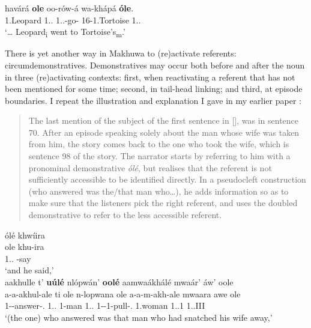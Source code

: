 \documentclass[output=paper]{langscibook}
\begin{document}
\sn
\gll
havárá  \textbf{ole}  oo-rów-á  wa-khápá  \textbf{óle}.{\footnotemark}\\
1.Leopard  1.\DEM{}.\DIST{}  1\SM{}.\PFV{}.\DJ{}-go-\FV{}  16-1.Tortoise  1.\DEM{}.\DIST{}\\
\glt
‘… Leopard\textsubscript{i} went to Tortoise’s\textsubscript{m}.’
\z

There is yet another way in Makhuwa to (re)activate referents: circumdemonstratives. Demonstratives may occur both before and after the noun in three (re)activating contexts: first, when reactivating a referent that has not been mentioned for some time; second, in tail-head linking; and third, at episode boundaries. I repeat the illustration and explanation I gave in my earlier paper \citep[200--201]{vanderWal2010}: 

\begin{quote}
The last mention of the subject of the first sentence in [], was in sentence 70. After an episode speaking solely about the man whose wife was taken from him, the story comes back to the one who took the wife, which is sentence 98 of the story. The narrator starts by referring to him with a pronominal demonstrative \textit{ólé}, but realises that the referent is not sufficiently accessible to be identified directly. In a pseudocleft construction (who answered was the/that man who…), he adds information so as to make sure that the listeners pick the right referent, and uses the doubled demonstrative to refer to the less accessible referent.
\end{quote}


\ea
\label{bkm:Ref117585368}
ólé  khwíira\\
\gll
ole  khu-ira\\
1.\DEM{}.\DIST{}  \NARR{}-say\\
\glt
‘and he said,’\\


aakhulle  t’  \textbf{uúlé}  nlópwán’  \textbf{oolé}  aamwaákhálé  mwaár’  áw’  oole \\
\gll
  a-a-akhul-ale  ti  ole  n-lopwana  ole  a-a-m-akh-ale  mwaara  awe  ole \\
1-\PST{}-answer-\PFV{}.\REL{}  \COP{}  1.\DEM{}.\DIST{}  1-man  1.\DEM{}.\DIST{}  1{}-\PST{}-1\OM{}-pull-\PFV{}.\REL{}  1.woman  1.\POSS{}.1  1.\DEM{}.III\\
\glt
‘(the one) who answered was that man who had snatched his wife away,’\\
\end{document}
